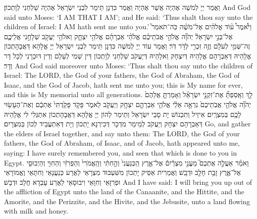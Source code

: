 {{וַאֲמַר יְיָ לְמֹשֶׁה אֶהְיֶה אֲשֶׁר אֶהְיֶה וַאֲמַר כִּדְנָן תֵּימַר לִבְנֵי יִשְׂרָאֵל אֶהְיֶה שַׁלְחַנִי לְוָתְכוֹן׃}
{And God said unto Moses: ‘I AM THAT I AM’; and He said: ‘Thus shalt thou say unto the children of Israel: I AM hath sent me unto you.’}{}
{וַיֹּ֩אמֶר֩ ע֨וֹד אֱלֹהִ֜ים אֶל־מֹשֶׁ֗ה כֹּֽה־תֹאמַר֮ אֶל־בְּנֵ֣י יִשְׂרָאֵל֒ יְהֹוָ֞ה אֱלֹהֵ֣י אֲבֹתֵיכֶ֗ם אֱלֹהֵ֨י אַבְרָהָ֜ם אֱלֹהֵ֥י יִצְחָ֛ק וֵאלֹהֵ֥י יַעֲקֹ֖ב שְׁלָחַ֣נִי אֲלֵיכֶ֑ם זֶה־שְּׁמִ֣י לְעֹלָ֔ם וְזֶ֥ה זִכְרִ֖י לְדֹ֥ר דֹּֽר׃
}
{וַאֲמַר עוֹד יְיָ לְמֹשֶׁה כִּדְנָן תֵּימַר לִבְנֵי יִשְׂרָאֵל יְיָ אֱלָהָא דַּאֲבָהָתְכוֹן אֱלָהֵיהּ דְּאַבְרָהָם אֱלָהֵיהּ דְּיִצְחָק וֵאלָהֵיהּ דְּיַעֲקֹב שַׁלְחַנִי לְוָתְכוֹן דֵּין שְׁמִי לְעָלַם וְדֵין דּוּכְרָנִי לְכָל דָר וְדָר׃}
{And God said moreover unto Moses: ‘Thus shalt thou say unto the children of Israel: The LORD, the God of your fathers, the God of Abraham, the God of Isaac, and the God of Jacob, hath sent me unto you; this is My name for ever, and this is My memorial unto all generations.}{}
{לֵ֣ךְ וְאָֽסַפְתָּ֞ אֶת־זִקְנֵ֣י יִשְׂרָאֵ֗ל וְאָמַרְתָּ֤ אֲלֵהֶם֙ יְהֹוָ֞ה אֱלֹהֵ֤י אֲבֹֽתֵיכֶם֙ נִרְאָ֣ה אֵלַ֔י אֱלֹהֵ֧י אַבְרָהָ֛ם יִצְחָ֥ק וְיַעֲקֹ֖ב לֵאמֹ֑ר פָּקֹ֤ד פָּקַ֙דְתִּי֙ אֶתְכֶ֔ם וְאֶת־הֶעָשׂ֥וּי לָכֶ֖ם בְּמִצְרָֽיִם׃
}
{אִיזֵיל וְתִכְנוֹשׁ יָת סָבֵי יִשְׂרָאֵל וְתֵימַר לְהוֹן יְיָ אֱלָהָא דַּאֲבָהָתְכוֹן אִתְגְּלִי לִי אֱלָהֵיהּ דְּאַבְרָהָם יִצְחָק וְיַעֲקֹב לְמֵימַר מִדְכָר דְּכִירְנָא יָתְכוֹן וְיָת דְּאִתְעֲבֵיד לְכוֹן בְּמִצְרָיִם׃}
{Go, and gather the elders of Israel together, and say unto them: The LORD, the God of your fathers, the God of Abraham, of Isaac, and of Jacob, hath appeared unto me, saying: I have surely remembered you, and seen that which is done to you in Egypt.}{}
{וָאֹמַ֗ר אַעֲלֶ֣ה אֶתְכֶם֮ מֵעֳנִ֣י מִצְרַ֒יִם֒ אֶל־אֶ֤רֶץ הַֽכְּנַעֲנִי֙ וְהַ֣חִתִּ֔י וְהָֽאֱמֹרִי֙ וְהַפְּרִזִּ֔י וְהַחִוִּ֖י וְהַיְבוּסִ֑י אֶל־אֶ֛רֶץ זָבַ֥ת חָלָ֖ב וּדְבָֽשׁ׃}
{וַאֲמַרִית אַסֵּיק יָתְכוֹן מִשִּׁעְבּוּד מִצְרָאֵי לַאֲרַע כְּנַעֲנָאֵי וְחִתָּאֵי וֶאֱמוֹרָאֵי וּפְרִזָּאֵי וְחִוָּאֵי וִיבוּסָאֵי לַאֲרַע עָבְדָא חֲלָב וּדְבָשׁ׃}
{And I have said: I will bring you up out of the affliction of Egypt unto the land of the Canaanite, and the Hittite, and the Amorite, and the Perizzite, and the Hivite, and the Jebusite, unto a land flowing with milk and honey.}{}
}
